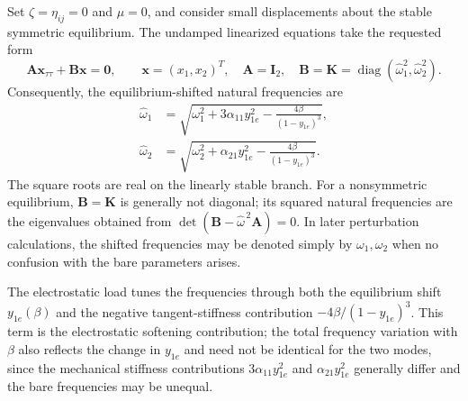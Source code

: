 \documentclass[11pt]{article}
\begin{document}
Set $\zeta=\eta_{ij}=0$ and $\mu=0$, and consider small displacements about the stable symmetric equilibrium. The undamped linearized equations take the requested form
\begin{equation}\label{eq:undamped-eigenproblem}
\mathbf{A}\mathbf{x}_{\tau\tau}+\mathbf{B}\mathbf{x}=\mathbf{0},\qquad
\mathbf{x}=(x_1,x_2)^T,\quad \mathbf{A}=\mathbf{I}_2,\quad
\mathbf{B}=\mathbf{K}=\operatorname{diag}(\widehat{\omega}_1^2,\widehat{\omega}_2^2).
\end{equation}
Consequently, the equilibrium-shifted natural frequencies are
\begin{align}
\widehat{\omega}_1&=\sqrt{\omega_1^2+3\alpha_{11}y_{1e}^2-\frac{4\beta}{(1-y_{1e})^3}},\label{eq:frequency-one}\\
\widehat{\omega}_2&=\sqrt{\omega_2^2+\alpha_{21}y_{1e}^2-\frac{4\beta}{(1-y_{1e})^3}}.\label{eq:frequency-two}
\end{align}
The square roots are real on the linearly stable branch. For a nonsymmetric equilibrium, $\mathbf{B}=\mathbf{K}$ is generally not diagonal; its squared natural frequencies are the eigenvalues obtained from $\det(\mathbf{B}-\widehat{\omega}^{\,2}\mathbf{A})=0$. In later perturbation calculations, the shifted frequencies may be denoted simply by $\omega_1,\omega_2$ when no confusion with the bare parameters arises.

The electrostatic load tunes the frequencies through both the equilibrium shift $y_{1e}(\beta)$ and the negative tangent-stiffness contribution $-4\beta/(1-y_{1e})^3$. This term is the electrostatic softening contribution; the total frequency variation with $\beta$ also reflects the change in $y_{1e}$ and need not be identical for the two modes, since the mechanical stiffness contributions $3\alpha_{11}y_{1e}^2$ and $\alpha_{21}y_{1e}^2$ generally differ and the bare frequencies may be unequal.
\end{document}
